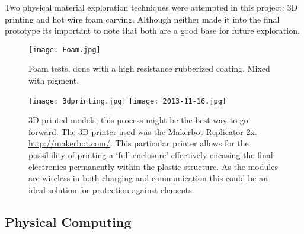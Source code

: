
Two physical material exploration techniques were attempted in this project: 3D printing and hot wire foam carving. Although neither made it into the final prototype its important to note that both are a good base for future exploration. 

\begin{figure*}
  \texttt{[image: Foam.jpg]}
  \caption{Foam tests, done with a high resistance rubberized coating. Mixed with pigment.}
  \label{fig:foam}
\end{figure*}

\begin{figure}
  \texttt{[image: 3dprinting.jpg]}
  \texttt{[image: 2013-11-16.jpg]}
  \caption{3D printed models, this process might be the best way to go forward. The 3D printer used was the Makerbot Replicator 2x. \url{http://makerbot.com/}. This particular printer allows for the possibility of printing a `full enclosure' effectively encasing the final electronics permanently within the plastic structure. As the modules are wireless in both charging and communication this could be an ideal solution for protection against elements.}
  \label{fig:plastic}
\end{figure}
\FloatBarrier
\newpage

\subsection{Physical Computing}\label{subsec:physicalcomputing}

